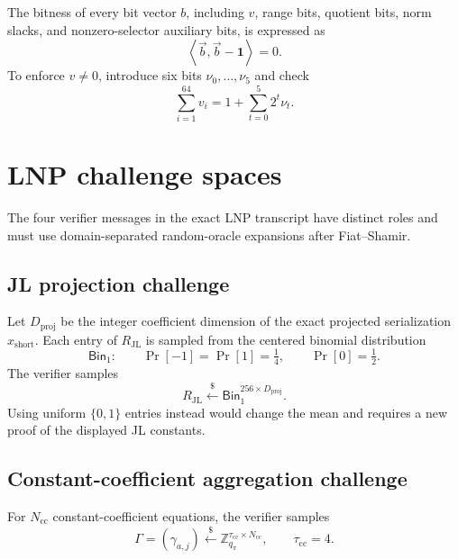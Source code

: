 \documentclass[11pt,a4paper]{article}
\newcommand{\Z}{\mathbb{Z}}
\newcommand{\proofmod}{q_{\pi}}
\newcommand{\Bin}{\mathsf{Bin}}
\newcommand{\vecx}[1]{\overrightarrow{#1}}
\newcommand{\inner}[2]{\left\langle #1,#2\right\rangle}
\newcommand{\getsr}{\xleftarrow{\$}}
\newcommand{\one}{\mathbf{1}}
\begin{document}
The bitness of every bit vector \(b\), including \(v\), range bits, quotient
bits, norm slacks, and nonzero-selector auxiliary bits, is expressed as
\begin{equation}
  \inner{\vecx b}{\vecx b-\one}=0.
  \label{eq:generic-bitness}
\end{equation}
To enforce \(v\ne0\), introduce six bits \(\nu_0,\ldots,\nu_5\) and check
\begin{equation}
  \sum_{i=1}^{64}v_i
  =1+\sum_{t=0}^{5}2^t\nu_t.
  \label{eq:nonzero-selector}
\end{equation}

\section{LNP challenge spaces}

The four verifier messages in the exact LNP transcript have distinct roles and
must use domain-separated random-oracle expansions after Fiat--Shamir.

\subsection{JL projection challenge}

Let \(D_{\mathrm{proj}}\) be the integer coefficient dimension of the exact
projected serialization \(x_{\mathrm{short}}\).  Each entry of
\(R_{\mathrm{JL}}\) is sampled from the centered binomial distribution
\[
  \Bin_1:\qquad
  \Pr[-1]=\Pr[1]=\tfrac14,\qquad \Pr[0]=\tfrac12.
\]
The verifier samples
\begin{equation}
  R_{\mathrm{JL}}\getsr
  \Bin_1^{256\times D_{\mathrm{proj}}}.
  \label{eq:JL-challenge}
\end{equation}
Using uniform \(\{0,1\}\) entries instead would change the mean and requires a
new proof of the displayed JL constants.

\subsection{Constant-coefficient aggregation challenge}

For \(N_{\mathrm{cc}}\) constant-coefficient equations, the verifier samples
\begin{equation}
  \Gamma=(\gamma_{a,j})
  \getsr\Z_{\proofmod}^{\tau_{\mathrm{cc}}\times N_{\mathrm{cc}}},
  \qquad \tau_{\mathrm{cc}}=4.
  \label{eq:Gamma-challenge}
\end{equation}
\end{document}
